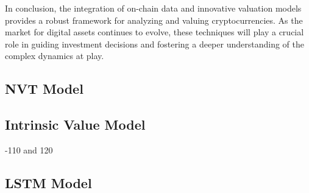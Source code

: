 In conclusion, the integration of on-chain data and innovative valuation models provides a robust framework for analyzing and valuing cryptocurrencies. As the market for digital assets continues to evolve, these techniques will play a crucial role in guiding investment decisions and fostering a deeper understanding of the complex dynamics at play.


\subsection{NVT Model}

\subsection{Intrinsic Value Model}
-110 and 120
\subsection{LSTM Model}